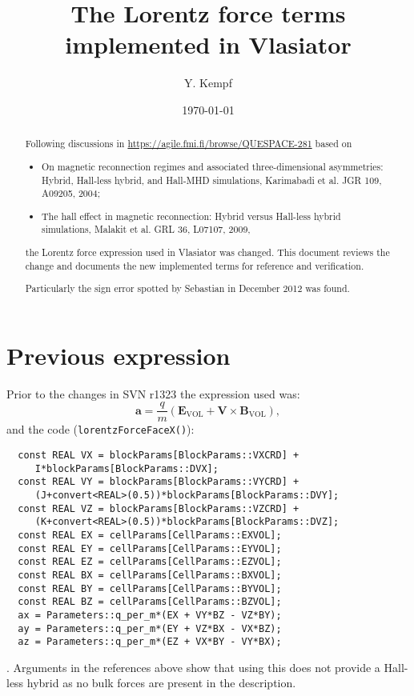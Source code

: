 \documentclass[a4paper,10pt]{article}
\title{The Lorentz force terms implemented in Vlasiator}
\date{\today}
\author{Y. Kempf}
\begin{document}
\lstset{language=C++}
\maketitle

\begin{abstract}
Following discussions in \url{https://agile.fmi.fi/browse/QUESPACE-281} based on
\begin{itemize}
   \item On magnetic reconnection regimes and associated three-dimensional asymmetries: Hybrid, Hall-less hybrid, and Hall-MHD simulations, Karimabadi et al. JGR 109, A09205, 2004;
   \item The hall effect in magnetic reconnection: Hybrid versus Hall-less hybrid simulations, Malakit et al. GRL 36, L07107, 2009,
\end{itemize}
the Lorentz force expression used in Vlasiator was changed. This document reviews the change and documents the new implemented terms for reference and verification.

Particularly the sign error spotted by Sebastian in December 2012 was found.
\end{abstract}

\section{Previous expression}
Prior to the changes in SVN r1323 the expression used was:
\begin{equation}
   \mathbf{a} = \frac{q}{m}\left(\mathbf{E}_\mathrm{VOL} + \mathbf{V}\times\mathbf{B}_\mathrm{VOL}\right),
\end{equation}
and the code (\verb=lorentzForceFaceX()=):
\begin{lstlisting}
  const REAL VX = blockParams[BlockParams::VXCRD] +
     I*blockParams[BlockParams::DVX];
  const REAL VY = blockParams[BlockParams::VYCRD] +
     (J+convert<REAL>(0.5))*blockParams[BlockParams::DVY];
  const REAL VZ = blockParams[BlockParams::VZCRD] +
     (K+convert<REAL>(0.5))*blockParams[BlockParams::DVZ];
  const REAL EX = cellParams[CellParams::EXVOL];
  const REAL EY = cellParams[CellParams::EYVOL];
  const REAL EZ = cellParams[CellParams::EZVOL];
  const REAL BX = cellParams[CellParams::BXVOL];
  const REAL BY = cellParams[CellParams::BYVOL];
  const REAL BZ = cellParams[CellParams::BZVOL];
  ax = Parameters::q_per_m*(EX + VY*BZ - VZ*BY);
  ay = Parameters::q_per_m*(EY + VZ*BX - VX*BZ);
  az = Parameters::q_per_m*(EZ + VX*BY - VY*BX);
\end{lstlisting}
. Arguments in the references above show that using this does not provide a Hall-less hybrid as no bulk forces are present in the description.
\end{document}
